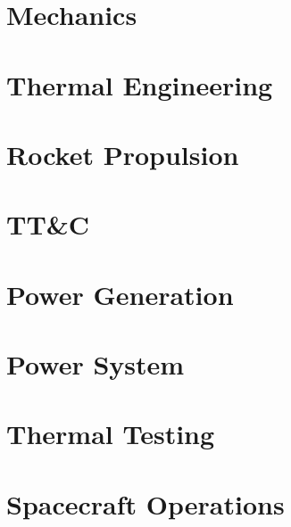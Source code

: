 \documentclass[a4paper,10pt]{article}
\begin{document}
\section{Mechanics}

\section{Thermal Engineering}

\section{Rocket Propulsion}

\section{TT\&C}

\section{Power Generation}

\section{Power System}

\section{Thermal Testing}

\section{Spacecraft Operations}
\end{document}
